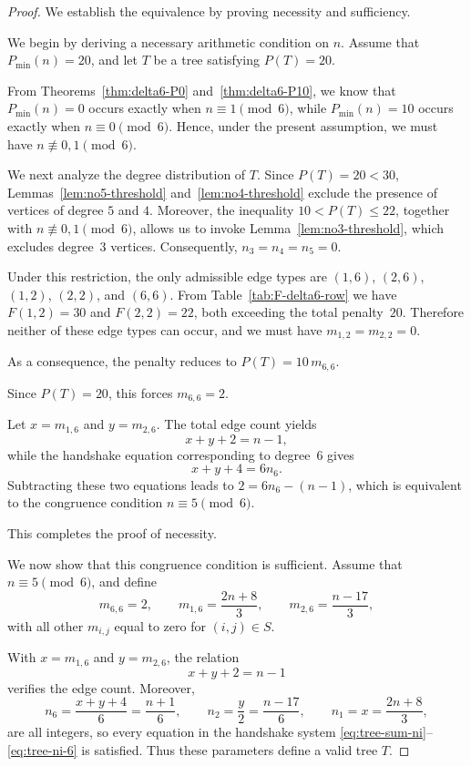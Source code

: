 \documentclass[preprint,12pt]{elsarticle}
\begin{document}
\begin{proof}
We establish the equivalence by proving necessity and sufficiency.

\medskip
We begin by deriving a necessary arithmetic condition on $n$.
Assume that $P_{\min}(n)=20$, and let $T$ be a tree satisfying $P(T)=20$.

From Theorems~\ref{thm:delta6-P0} and~\ref{thm:delta6-P10}, we know that
$P_{\min}(n)=0$ occurs exactly when $n\equiv 1\pmod 6$, while
$P_{\min}(n)=10$ occurs exactly when $n\equiv 0\pmod 6$.
Hence, under the present assumption, we must have $n\not\equiv 0,1 \pmod 6$.


We next analyze the degree distribution of $T$.
Since $P(T)=20<30$, Lemmas~\ref{lem:no5-threshold} and~\ref{lem:no4-threshold}
exclude the presence of vertices of degree $5$ and $4$.
Moreover, the inequality $10<P(T)\le 22$, together with
$n\not\equiv 0,1\pmod 6$, allows us to invoke
Lemma~\ref{lem:no3-threshold}, which excludes degree~$3$ vertices.
Consequently, $n_3=n_4=n_5=0$.


Under this restriction, the only admissible edge types are
$(1,6)$, $(2,6)$, $(1,2)$, $(2,2)$, and $(6,6)$.
From Table~\ref{tab:F-delta6-row} we have
$F(1,2)=30$ and $F(2,2)=22$, both exceeding the total penalty~$20$.
Therefore neither of these edge types can occur, and we must have $m_{1,2}=m_{2,2}=0$.


As a consequence, the penalty reduces to
$P(T)=10\,m_{6,6}$.

Since $P(T)=20$, this forces $m_{6,6}=2$.

Let $x=m_{1,6}$ and $y=m_{2,6}$.
The total edge count yields
\[
x+y+2=n-1,
\]
while the handshake equation corresponding to degree~$6$ gives
\[
x+y+4=6n_6.
\]
Subtracting these two equations leads to $2=6n_6-(n-1)$,
which is equivalent to the congruence condition
$n\equiv 5 \pmod 6$.

This completes the proof of necessity.

\medskip
We now show that this congruence condition is sufficient.
Assume that $n\equiv 5\pmod 6$, and define
\[
m_{6,6}=2,\qquad
m_{1,6}=\frac{2n+8}{3},\qquad
m_{2,6}=\frac{n-17}{3},
\]
with all other $m_{i,j}$ equal to zero for $(i,j)\in S$.

With $x=m_{1,6}$ and $y=m_{2,6}$, the relation
\[
x+y+2=n-1
\]
verifies the edge count.
Moreover,
\[
n_6=\frac{x+y+4}{6}=\frac{n+1}{6},\qquad
n_2=\frac{y}{2}=\frac{n-17}{6},\qquad
n_1=x=\frac{2n+8}{3},
\]
are all integers, so every equation in the handshake system
\eqref{eq:tree-sum-ni}--\eqref{eq:tree-ni-6} is satisfied.
Thus these parameters define a valid tree $T$.


\end{proof}
\end{document}
